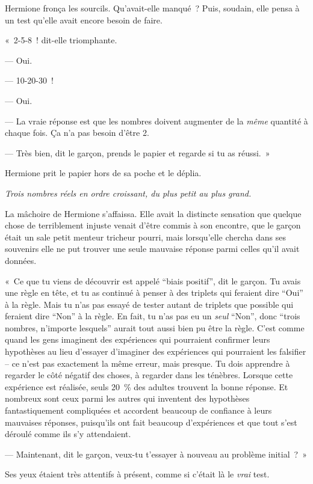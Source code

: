 Hermione fronça les sourcils. Qu'avait-elle manqué~? Puis, soudain, elle pensa à un test qu'elle avait encore besoin de faire.

«~2-5-8~! dit-elle triomphante.

--- Oui.

--- 10-20-30~!

--- Oui.

--- La vraie réponse est que les nombres doivent augmenter de la \emph{même} quantité à chaque fois. Ça n'a pas besoin d'être 2.

--- Très bien, dit le garçon, prends le papier et regarde si tu as réussi.~»

Hermione prit le papier hors de sa poche et le déplia.

\emph{Trois nombres réels en ordre croissant, du plus petit au plus grand.}

La mâchoire de Hermione s'affaissa. Elle avait la distincte sensation que quelque chose de terriblement injuste venait d'être commis à son encontre, que le garçon était un sale petit menteur tricheur pourri, mais lorsqu'elle chercha dans ses souvenirs elle ne put trouver une seule mauvaise réponse parmi celles qu'il avait données.

«~Ce que tu viens de découvrir est appelé “biais positif”, dit le garçon. Tu avais une règle en tête, et tu as continué à penser à des triplets qui feraient dire “Oui” à la règle. Mais tu n'as pas essayé de tester autant de triplets que possible qui feraient dire “Non” à la règle. En fait, tu n'as pas eu un \emph{seul} “Non”, donc “trois nombres, n'importe lesquels” aurait tout aussi bien pu être la règle. C'est comme quand les gens imaginent des expériences qui pourraient confirmer leurs hypothèses au lieu d'essayer d'imaginer des expériences qui pourraient les falsifier -- ce n'est pas exactement la même erreur, mais presque. Tu dois apprendre à regarder le côté négatif des choses, à regarder dans les ténèbres. Lorsque cette expérience est réalisée, seuls 20~\% des adultes trouvent la bonne réponse. Et nombreux sont ceux parmi les autres qui inventent des hypothèses fantastiquement compliquées et accordent beaucoup de confiance à leurs mauvaises réponses, puisqu'ils ont fait beaucoup d'expériences et que tout s'est déroulé comme ils s'y attendaient.

--- Maintenant, dit le garçon, veux-tu t'essayer à nouveau au problème initial~?~»

Ses yeux étaient très attentifs à présent, comme si c'était là le \emph{vrai} test.

